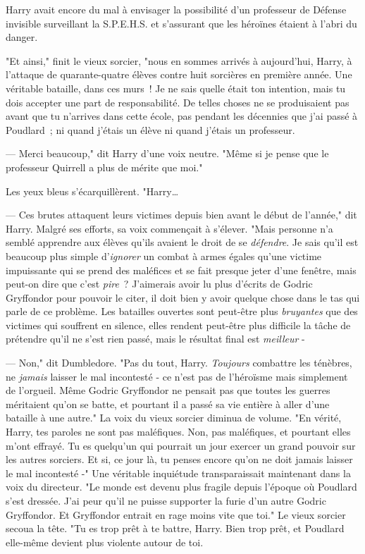 Harry avait encore du mal à envisager la possibilité d'un professeur de Défense invisible surveillant la S.P.E.H.S. et s'assurant que les héroïnes étaient à l'abri du danger.

"Et ainsi," finit le vieux sorcier, "nous en sommes arrivés à aujourd'hui, Harry, à l'attaque de quarante-quatre élèves contre huit sorcières en première année. Une véritable bataille, dans ces murs~! Je ne sais quelle était ton intention, mais tu dois accepter une part de responsabilité. De telles choses ne se produisaient pas avant que tu n'arrives dans cette école, pas pendant les décennies que j'ai passé à Poudlard~; ni quand j'étais un élève ni quand j'étais un professeur.

--- Merci beaucoup," dit Harry d'une voix neutre. "Même si je pense que le professeur Quirrell a plus de mérite que moi."

Les yeux bleus s'écarquillèrent. "Harry…

--- Ces brutes attaquent leurs victimes depuis bien avant le début de l'année," dit Harry. Malgré ses efforts, sa voix commençait à s'élever. "Mais personne n'a semblé apprendre aux élèves qu'ils avaient le droit de se \emph{défendre}. Je sais qu'il est beaucoup plus simple d'\emph{ignorer} un combat à armes égales qu'une victime impuissante qui se prend des maléfices et se fait presque jeter d'une fenêtre, mais peut-on dire que c'est \emph{pire}~? J'aimerais avoir lu plus d'écrits de Godric Gryffondor pour pouvoir le citer, il doit bien y avoir quelque chose dans le tas qui parle de ce problème. Les batailles ouvertes sont peut-être plus \emph{bruyantes} que des victimes qui souffrent en silence, elles rendent peut-être plus difficile la tâche de prétendre qu'il ne s'est rien passé, mais le résultat final est \emph{meilleur} -

--- Non," dit Dumbledore. "Pas du tout, Harry. \emph{Toujours} combattre les ténèbres, ne \emph{jamais} laisser le mal incontesté - ce n'est pas de l'héroïsme mais simplement de l'orgueil. Même Godric Gryffondor ne pensait pas que toutes les guerres méritaient qu'on se batte, et pourtant il a passé sa vie entière à aller d'une bataille à une autre." La voix du vieux sorcier diminua de volume. "En vérité, Harry, tes paroles ne sont pas maléfiques. Non, pas maléfiques, et pourtant elles m'ont effrayé. Tu es quelqu'un qui pourrait un jour exercer un grand pouvoir sur les autres sorciers. Et si, ce jour là, tu penses encore qu'on ne doit jamais laisser le mal incontesté -" Une véritable inquiétude transparaissait maintenant dans la voix du directeur. "Le monde est devenu plus fragile depuis l'époque où Poudlard s'est dressée. J'ai peur qu'il ne puisse supporter la furie d'un autre Godric Gryffondor. Et Gryffondor entrait en rage moins vite que toi." Le vieux sorcier secoua la tête. "Tu es trop prêt à te battre, Harry. Bien trop prêt, et Poudlard elle-même devient plus violente autour de toi.

